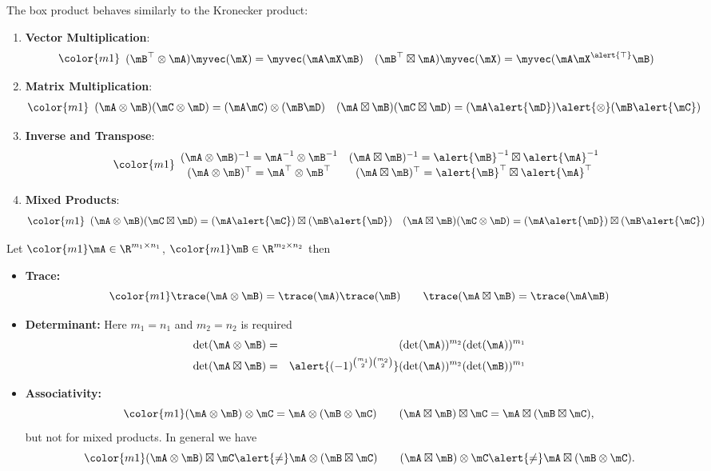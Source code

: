 \begin{frame}
The box product behaves similarly to the Kronecker product:
\begin{enumerate}
\item<1-> \textbf{Vector Multiplication}:
{\small
$$\color{m1}
\begin{array}{cc}
(\mB^\top\otimes\mA)\myvec(\mX)=\myvec(\mA\mX\mB) &
(\mB^\top\boxtimes\mA)\myvec(\mX)=\myvec(\mA\mX^{\alert{\top}}\mB)
\end{array}
$$}
\item<2-> \textbf{Matrix Multiplication}:
{\small
$$\color{m1}
\begin{array}{cc}
(\mA\otimes\mB)(\mC\otimes\mD)=(\mA\mC)\otimes(\mB\mD)&
(\mA\boxtimes\mB)(\mC\boxtimes\mD)=(\mA\alert{\mD})\alert{\otimes}(\mB\alert{\mC})
\end{array}
$$}
\item<3-> \textbf{Inverse and Transpose}:
{\small
$$\color{m1}
\begin{array}{cc}
(\mA\otimes\mB)^{-1}=\mA^{-1}\otimes\mB^{-1} &
(\mA\boxtimes\mB)^{-1}=\alert{\mB}^{-1}\boxtimes\alert{\mA}^{-1}\\
(\mA\otimes\mB)^{\top}=\mA^{\top}\otimes\mB^{\top} &
(\mA\boxtimes\mB)^{\top}=\alert{\mB}^{\top}\boxtimes\alert{\mA}^{\top}
\end{array}
$$}
\item<4-> \textbf{Mixed Products}:
{\small
$$\color{m1}
\begin{array}{cc}
(\mA\otimes\mB)(\mC\boxtimes\mD) =
  (\mA\alert{\mC})\boxtimes(\mB\alert{\mD}) &
(\mA\boxtimes\mB)(\mC\otimes\mD) =
  (\mA\alert{\mD})\boxtimes(\mB\alert{\mC})
\end{array}
$$}
\end{enumerate}
\end{frame}

\begin{frame}
Let $\color{m1}\mA\in\R^{m_1\times n_1}$, $\color{m1}\mB\in\R^{m_2\times n_2}$ then
\begin{itemize}
\item \textbf{Trace:}
$$\color{m1}
\trace(\mA\otimes\mB) =
\trace(\mA)\trace(\mB)\qquad\trace(\mA\boxtimes\mB) = \trace(\mA\mB)
$$
\item \textbf{Determinant:}  Here $m_1=n_1$ and $m_2=n_2$ is required
{
\color{m1}
\begin{eqnarray*}
\det(\mA\otimes\mB) &=&(\det(\mA))^{m_2}(\det(\mA))^{m_1}\\
\det(\mA\boxtimes\mB) &=&
\alert{(-1)^{{m_1 \choose 2}{m_2\choose 2}}}(\det(\mA))^{m_2}(\det(\mB))^{m_1}
\end{eqnarray*}}
\item \textbf{Associativity:}
$$\color{m1}
(\mA\otimes\mB)\otimes\mC=
\mA\otimes(\mB\otimes\mC) \qquad 
(\mA\boxtimes\mB)\boxtimes\mC=
\mA\boxtimes(\mB\boxtimes\mC),
$$
but not for mixed products.  In general we have
$$\color{m1}
(\mA\otimes\mB)\boxtimes\mC \alert{\neq}
\mA\otimes(\mB\boxtimes\mC) \qquad 
(\mA\boxtimes\mB)\otimes\mC \alert{\neq}
\mA\boxtimes(\mB\otimes\mC).
$$

\end{itemize}

\end{frame}

